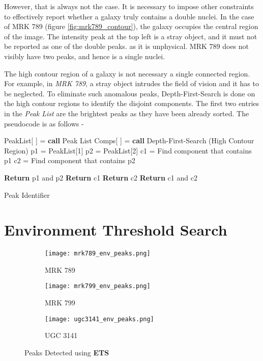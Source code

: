 \documentclass[12pt]{article}
\begin{document}
\bigskip

However, that is always not the case. It is necessary to impose other constraints to effectively report whether a galaxy truly contains a double nuclei. In the case of MRK 789 (figure \ref{fig:mrk789_contour}), the galaxy occupies the central region of the image. The intensity peak at the top left is a stray object, and it must not be reported as one of the double peaks. as it is unphysical. MRK 789 does not visibly have two peaks, and hence is a single nuclei.

\bigskip

The high contour region of a galaxy is not necessary a single connected region. For example, in \textit{MRK 789}, a stray object intrudes the field of vision and it has to be neglected. To eliminate such anomalous peaks, Depth-First-Search is done on the high contour regions to identify the disjoint components. The first two entries in the \textit{Peak List} are the brightest peaks as they have been already sorted. The pseudocode is as follows -

\bigskip

\begin{algorithm}[H]
\SetAlgoLined
 PeakList[   ] = \textbf{call} Peak List \;
 Comps[   ] = \textbf{call} Depth-First-Search (High Contour Region) \;
 p1 = PeakList[1] \;
 p2 = PeakList[2] \;
 c1 = Find component that contains p1 \;
 c2 = Find component that contains p2 \;
 
   {
   \textbf{Return} p1 and p2 \;
   }
   {
        {
            \textbf{Return} c1 \;
        }
        {
            \textbf{Return} c2 \;
        }
        \Else
        {
            \textbf{Return} c1 and c2 \;
        }
   }
 \newline
 \caption{Peak Identifier}
\end{algorithm}

\section{Environment Threshold Search}

\begin{figure}[!htb]
    \begin{subfigure}[h]{0.32\textwidth}
        \texttt{[image: mrk789\_env\_peaks.png]}
        \caption{MRK 789}
        \label{fig:mrk789_env_peak}
    \end{subfigure}
    \hfill
    \begin{subfigure}[h]{0.32\textwidth}
        \texttt{[image: mrk799\_env\_peaks.png]}
        \caption{MRK 799}
        \label{fig:mrk799_env_peak}
    \end{subfigure}
    \hfill
    \begin{subfigure}[h]{0.32\textwidth}
        \texttt{[image: ugc3141\_env\_peaks.png]}
        \caption{UGC 3141}
        \label{fig:ugc3141_env_peak}
    \end{subfigure}
    
    \caption{Peaks Detected using \textbf{ETS}}
    \label{fig:ets_peaks}
\end{figure}
\end{document}

